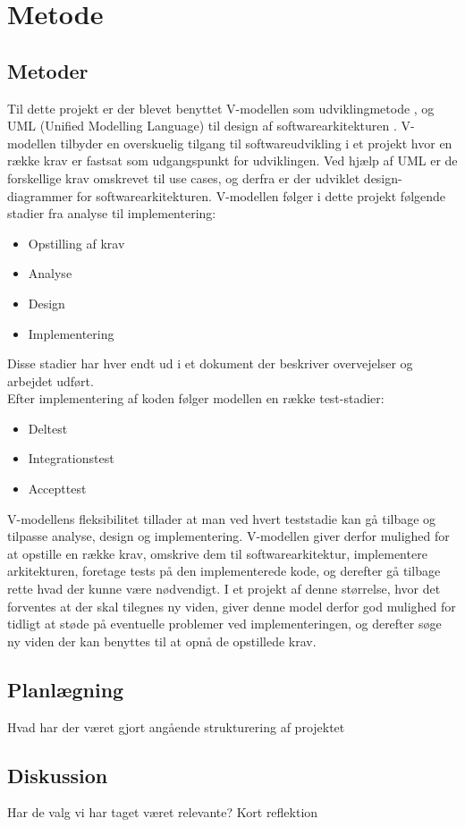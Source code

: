\documentclass[rapport.tex]{subfiles}
\begin{document}
\section{Metode}
	\subsection{Metoder}
	Til dette projekt er der blevet benyttet V-modellen som udviklingmetode \cite{Vmodel}, og UML (Unified Modelling Language) \cite{UML} til design af softwarearkitekturen . V-modellen tilbyder en overskuelig tilgang til softwareudvikling i et projekt hvor en række krav er fastsat som udgangspunkt for udviklingen. Ved hjælp af UML er de forskellige krav omskrevet til use cases, og derfra er der udviklet design-diagrammer for softwarearkitekturen. 
	V-modellen følger i dette projekt følgende stadier fra analyse til implementering:
	\begin{itemize}
		\item Opstilling af krav
		\item Analyse
		\item Design
		\item Implementering
	\end{itemize}
	Disse stadier har hver endt ud i et dokument der beskriver overvejelser og arbejdet udført. \\
	
	Efter implementering af koden følger modellen en række test-stadier:
	\begin{itemize}
		\item Deltest
		\item Integrationstest
		\item Accepttest
	\end{itemize}
	
	V-modellens fleksibilitet tillader at man ved hvert teststadie kan gå tilbage og tilpasse analyse, design og implementering. 
	V-modellen giver derfor mulighed for at opstille en række krav, omskrive dem til softwarearkitektur, implementere arkitekturen, foretage tests på den implementerede kode, og derefter gå tilbage rette hvad der kunne være nødvendigt. 
	I et projekt af denne størrelse, hvor det forventes at der skal tilegnes ny viden, giver denne model derfor god mulighed for tidligt at støde på eventuelle problemer ved implementeringen, og derefter søge ny viden der kan benyttes til at opnå de opstillede krav. 
	
	\subsection{Planlægning}
	Hvad har der været gjort angående strukturering af projektet
	\subsection{Diskussion}
	Har de valg vi har taget været relevante? Kort reflektion
		
\end{document}
